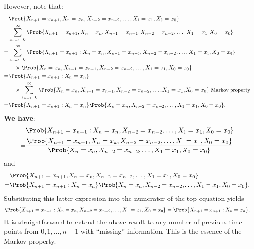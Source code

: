 \begin{Regular}
\begin{enumerate}[(1)]
              However, note that:
              \begin{align*}
                    & \Prob{X_{n+1}=x_{n+1}, X_{n}=x_{n}, X_{n-2}=x_{n-2}, \ldots, X_{1}=x_{1}, X_{0}=x_{0}}                                                                      \\
                  = & \sum_{x_{n-1}=0}^{\infty} \Prob{X_{n+1}=x_{n+1}, X_{n}=x_{n}, X_{n-1}=x_{n-1}, X_{n-2}=x_{n-2}, \ldots, X_{1}=x_{1}, X_{0}=x_{0}}                           \\
                  = & \sum_{x_{n-1}=0}^{\infty} \Prob{X_{n+1}=x_{n+1} \given X_{n}=x_{n}, X_{n-1}=x_{n-1}, X_{n-2}=x_{n-2}, \ldots, X_{1}=x_{1}, X_{0}=x_{0}}                     \\
                    & \quad\times \Prob{X_{n}=x_{n}, X_{n-1}=x_{n-1}, X_{n-2}=x_{n-2}, \ldots, X_{1}=x_{1}, X_{0}=x_{0}}                                                          \\
                  = & \Prob{X_{n+1}=x_{n+1} \given X_{n}=x_{n}}                                                                                                                   \\
                    & \quad\times \sum_{x_{n-1}=0}^{\infty} \Prob{X_{n}=x_{n}, X_{n-1}=x_{n-1}, X_{n-2}=x_{n-2}, \ldots, X_{1}=x_{1}, X_{0}=x_{0}} \text{ \small Markov property} \\
                  = & \Prob{X_{n+1}=x_{n+1} \given X_{n}=x_{n}} \Prob{X_{n}=x_{n}, X_{n-2}=x_{n-2}, \ldots, X_{1}=x_{1}, X_{0}=x_{0}}.
              \end{align*}
              \textbf{We have}:
              \begin{align*}
                    & \Prob{X_{n+1}=x_{n+1} \given X_{n}=x_{n}, X_{n-2}=x_{n-2}, \ldots, X_{1}=x_{1}, X_{0}=x_{0}}                                                                         \\
                  = & \frac{\Prob{X_{n+1}=x_{n+1}, X_{n}=x_{n}, X_{n-2}=x_{n-2}, \ldots, X_{1}=x_{1}, X_{0}=x_{0}}}{\Prob{X_{n}=x_{n}, X_{n-2}=x_{n-2}, \ldots, X_{1}=x_{1}, X_{0}=x_{0}}}
              \end{align*}
              and
              \begin{align*}
                    & \Prob{X_{n+1}=x_{n+1}, X_{n}=x_{n}, X_{n-2}=x_{n-2}, \ldots, X_{1}=x_{1}, X_{0}=x_{0}}                           \\
                  = & \Prob{X_{n+1}=x_{n+1} \given X_{n}=x_{n}} \Prob{X_{n}=x_{n}, X_{n-2}=x_{n-2}, \ldots, X_{1}=x_{1}, X_{0}=x_{0}}.
              \end{align*}
              Substituting this latter expression into the numerator of the top equation yields
              \[ \Prob{X_{n+1}=x_{n+1} \given X_{n}=x_{n}, X_{n-2}=x_{n-2}, \ldots, X_{1}=x_{1}, X_{0}=x_{0}}=\Prob{X_{n+1}=x_{n+1} \given X_{n}=x_{n}}. \]
              It is straightforward to extend the above result to any number of previous time points from
              $ 0,1,\ldots,n-1 $ with ``missing'' information. This is the essence of the Markov property.
    \end{enumerate}
\end{Regular}
